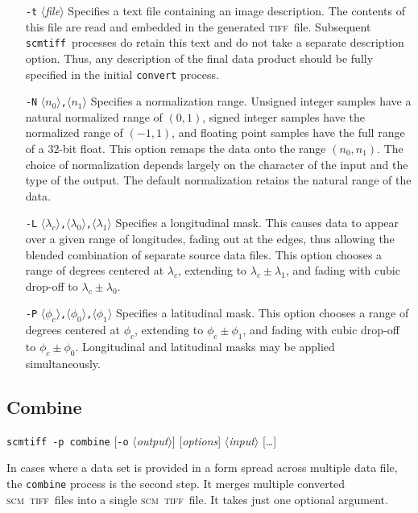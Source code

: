 \documentclass[oneside,11pt]{memoir}
\newcommand{\scm}     {\textsc{scm}}
\newcommand{\tiff}    {\textsc{tiff}}
\newcommand{\scmtiff} {\texttt{scmtiff}}
\newcommand{\inangles}[1]{$\langle$#1$\rangle$}
\begin{document}
\begin{Spacing}{1.1}
\begin{itemize}
\item[\texttt{-t} \inangles{\textit{file}}] Specifies a text file containing an image description. The contents of this file are read and embedded in the generated \tiff\ file. Subsequent \scmtiff\ processes do retain this text and do not take a separate description option. Thus, any description of the final data product should be fully specified in the initial \texttt{convert} process.

\item[\texttt{-N} \inangles{$n_0$}\texttt{,}\inangles{$n_1$}] Specifies a normalization range. Unsigned integer samples have a natural normalized range of $(0, 1)$, signed integer samples have the normalized range of $(-1,1)$, and floating point samples have the full range of a 32-bit float. This option remaps the data onto the range $(n_0,n_1)$. The choice of normalization depends largely on the character of the input and the type of the output. The default normalization retains the natural range of the data.

\item[\texttt{-L} \inangles{$\lambda_c$}\texttt{,}\inangles{$\lambda_0$}\texttt{,}\inangles{$\lambda_1$}] Specifies a longitudinal mask. This causes data to appear over a given range of longitudes, fading out at the edges, thus allowing the blended combination of separate source data files. This option chooses a range of degrees centered at $\lambda_c$, extending to $\lambda_c\pm\lambda_1$, and fading with cubic drop-off to $\lambda_c\pm\lambda_0$.

\item[\texttt{-P} \inangles{$\phi_c$}\texttt{,}\inangles{$\phi_0$}\texttt{,}\inangles{$\phi_1$}] Specifies a latitudinal mask. This option chooses a range of degrees centered at $\phi_c$, extending to $\phi_c\pm\phi_1$, and fading with cubic drop-off to $\phi_c\pm\phi_0$. Longitudinal and latitudinal masks may be applied simultaneously.

\end{itemize}

\subsection{Combine}

\noindent\scmtiff\ \texttt{-p combine} [\texttt{-o} \inangles{\textit{output}}] [\textit{options}] \inangles{\textit{input}} [\ldots]

\bigskip In cases where a data set is provided in a form spread across multiple data file, the \texttt{combine} process is the second step. It merges multiple converted \scm\ \tiff\ files into a single \scm\ \tiff\ file. It takes just one optional argument.


\end{Spacing}
\end{document}
